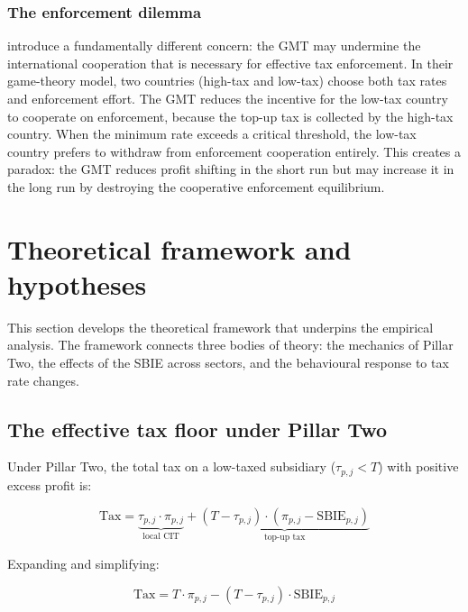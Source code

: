 \documentclass[11pt,a4paper]{article}
\begin{document}
\subsubsection{The enforcement dilemma}

\citet{jean2026} introduce a fundamentally different concern: the GMT may undermine the international cooperation that is necessary for effective tax enforcement. In their game-theory model, two countries (high-tax and low-tax) choose both tax rates and enforcement effort. The GMT reduces the incentive for the low-tax country to cooperate on enforcement, because the top-up tax is collected by the high-tax country. When the minimum rate exceeds a critical threshold, the low-tax country prefers to withdraw from enforcement cooperation entirely. This creates a paradox: the GMT reduces profit shifting in the short run but may increase it in the long run by destroying the cooperative enforcement equilibrium.

\newpage

\section{Theoretical framework and hypotheses}\label{sec:theory}

This section develops the theoretical framework that underpins the empirical analysis. The framework connects three bodies of theory: the mechanics of Pillar Two, the effects of the SBIE across sectors, and the behavioural response to tax rate changes.

\subsection{The effective tax floor under Pillar Two}\label{sec:floor_theory}

Under Pillar Two, the total tax on a low-taxed subsidiary ($\tau_{p,j} < T$) with positive excess profit is:

\begin{equation}\label{eq:total_tax}
\text{Tax} = \underbrace{\tau_{p,j} \cdot \pi_{p,j}}_{\text{local CIT}} + \underbrace{(T - \tau_{p,j}) \cdot (\pi_{p,j} - \text{SBIE}_{p,j})}_{\text{top-up tax}}
\end{equation}

Expanding and simplifying:

\begin{equation}\label{eq:total_tax_simplified}
\text{Tax} = T \cdot \pi_{p,j} - (T - \tau_{p,j}) \cdot \text{SBIE}_{p,j}
\end{equation}
\end{document}
